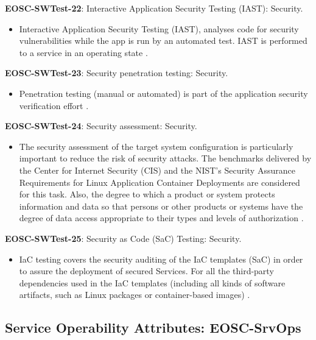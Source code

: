 \textbf{EOSC-SWTest-22}: Interactive Application Security Testing (IAST): Security.

\begin{itemize}
    \item Interactive Application Security Testing (IAST), analyses code for security vulnerabilities while the app is run by an automated test. IAST is performed to a service in an operating state \cite{orviz_fernandez_eosc-synergy_2020}.
\end{itemize}

\textbf{EOSC-SWTest-23}: Security penetration testing: Security.

\begin{itemize}
    \item Penetration testing (manual or automated) is part of the application security verification effort \cite{orviz_fernandez_eosc-synergy_2020}.
\end{itemize}

\textbf{EOSC-SWTest-24}: Security assessment: Security.

\begin{itemize}
    \item The security assessment of the target system configuration is particularly important to reduce the risk of security attacks. The benchmarks delivered by the Center for Internet Security (CIS) and the NIST's Security Assurance Requirements for Linux Application Container Deployments are considered for this task. Also, the degree to which a product or system protects information and data so that persons or other products or systems have the degree of data access appropriate to their types and levels of authorization \cite{iso_25010_2011_2017,orviz_fernandez_eosc-synergy_2020}.
\end{itemize}

\textbf{EOSC-SWTest-25}: Security as Code (SaC) Testing: Security.

\begin{itemize}
    \item IaC testing covers the security auditing of the IaC templates (SaC) in order to assure the deployment of secured Services. For all the third-party dependencies used in the IaC templates (including all kinds of software artifacts, such as Linux packages or container-based images) \cite{orviz_fernandez_eosc-synergy_2020}.
\end{itemize}

\subsection{Service Operability Attributes: EOSC-SrvOps}

